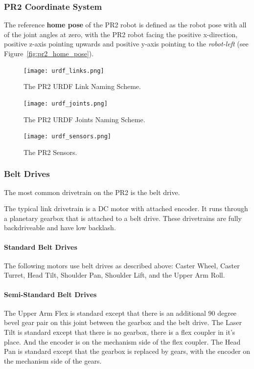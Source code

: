 \subsubsection{PR2 Coordinate System}
\label{sec:pr2_coordinate_system}
The reference {\bf home pose} of the PR2 robot is defined as the robot pose with all of the joint angles at zero,
with the PR2 robot facing the positive x-direction, positive z-axis pointing upwards and positive y-axis pointing to the {\it robot-left} (see Figure~\ref{fig:pr2_home_pose}).

\begin{figure}[!h]
\centering
\texttt{[image: urdf\_links.png]}
\caption{The PR2 URDF Link Naming Scheme.}
\label{fig:urdf_link_names}
\texttt{[image: urdf\_joints.png]}
\caption{The PR2 URDF Joints Naming Scheme.}
\label{fig:urdf_joints}
\texttt{[image: urdf\_sensors.png]}
\caption{The PR2 Sensors.}
\label{fig:urdf_sensor}
\end{figure}

\subsubsection{Belt Drives}
The most common drivetrain on the PR2 is the belt drive.  

The typical link drivetrain is a DC motor with attached encoder.  It
runs through a planetary gearbox that is attached to a belt
drive. These drivetrains are fully backdriveable and have low
backlash.

\paragraph{Standard Belt Drives}
The following motors use belt drives as described above: Caster Wheel,
Caster Turret, Head Tilt, Shoulder Pan, Shoulder Lift, and the Upper
Arm Roll.
\paragraph{Semi-Standard Belt Drives}
The Upper Arm Flex is standard except that there is an additional 90
degree bevel gear pair on this joint between the gearbox and the belt
drive.  The Laser Tilt is standard except that there is no gearbox,
there is a flex coupler in it's place.  And the encoder is on the
mechanism side of the flex coupler.  The Head Pan is standard except
that the gearbox is replaced by gears, with the encoder on the
mechanism side of the gears.



